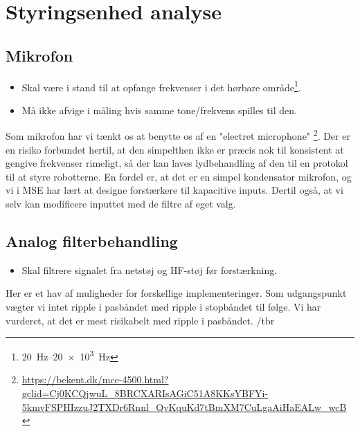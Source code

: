 \section {Styringsenhed analyse}
\subsection{Mikrofon}
\begin{itemize}
    \item Skal være i stand til at opfange frekvenser i det hørbare område\footnote{\SIrange{20}{20e3}{Hz}}. 
    \item Må ikke afvige i måling hvis samme tone/frekvens spilles til den. 
\end{itemize}

Som mikrofon har vi tænkt os at benytte os af en "electret microphone"\cite{CompleteECMGuide}\cite{MCE4500Datasheetb} \footnote{\url{https://bekent.dk/mce-4500.html?gclid=Cj0KCQjwuL_8BRCXARIsAGiC51A8KKsYBFYi-5kmvFSPHIzzuJ2TXDr6Rnnl_QvKquKd7tBmXM7CuLgaAiHaEALw_wcB}}.
Der er en risiko forbundet hertil, at den simpelthen ikke er præcis nok til konsistent at gengive frekvenser rimeligt, så der kan laves lydbehandling af den til en protokol til at styre robotterne. 
En fordel er, at det er en simpel kondensator mikrofon, og vi i MSE har lært at designe forstærkere til kapacitive inputs.
Dertil også, at vi selv kan modificere inputtet med de filtre af eget valg.

\subsection{Analog filterbehandling}
\begin{itemize}
    \item Skal filtrere signalet fra netstøj og HF-støj før forstærkning. 
\end{itemize}

Her er et hav af muligheder for forskellige implementeringer. Som udgangspunkt vægter vi intet ripple i pasbåndet med ripple i stopbåndet til følge. Vi har vurderet, at det er mest risikabelt med ripple i pasbåndet. /tbr %




